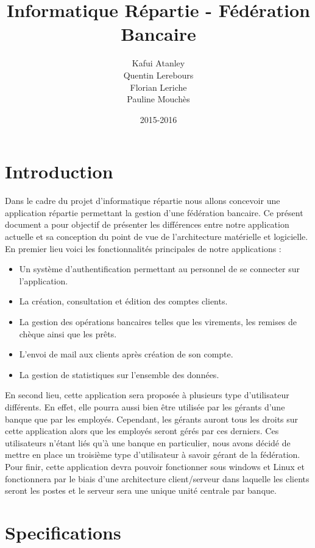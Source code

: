 \documentclass[a4paper,10pt]{report}
\title{Informatique Répartie - Fédération Bancaire}
\date{2015-2016}
\author{Kafui Atanley \\ Quentin Lerebours \\ Florian Leriche \\ Pauline Mouchès}
\begin{document}
\maketitle
\tableofcontents
\chapter{Introduction}

    

	Dans le cadre du projet d'informatique répartie nous allons concevoir une application répartie permettant la gestion d'une fédération bancaire. Ce présent document a pour objectif de présenter les différences entre notre application actuelle et sa conception du point de vue de l'architecture matérielle et logicielle.
En premier lieu voici les fonctionnalités principales de notre applications :
	\begin{itemize}
		\item Un système d'authentification permettant au personnel de se connecter sur l'application.
		\item La création, consultation et édition des comptes clients.
		\item La gestion des opérations bancaires telles que les virements, les remises de chèque ainsi que les prêts.
		\item L'envoi de mail aux clients après création de son compte.
		\item La gestion de statistiques sur l'ensemble des données.
		\end{itemize}
En second lieu, cette application sera proposée à plusieurs type d'utilisateur différents. En effet, elle pourra aussi bien être utilisée par les gérants d'une banque que par les employés. Cependant, les gérants auront tous les droits sur cette application alors que les employés seront gérés par ces derniers. Ces utilisateurs n'étant liés qu'à une banque en particulier, nous avons décidé de mettre en place un troisième type d'utilisateur à savoir gérant de la fédération. \\
	Pour finir, cette application devra pouvoir fonctionner sous windows et Linux et fonctionnera par le biais d'une architecture client/serveur dans laquelle les clients seront les postes et le serveur sera une unique unité centrale par banque.

\chapter{Specifications}
\end{document}
